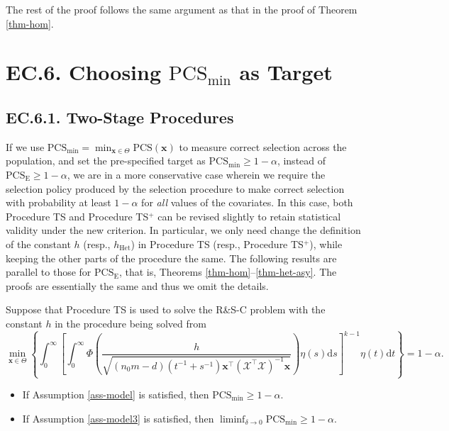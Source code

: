 \documentclass[ijoc,nonblindrev]{informs3}
\def\ud{\mathrm{d}}
\def\bx{{\bm x}}
\def\cX{{\mathcal X}}
\def\PCS{\mathrm{PCS}}
\def\PCSE{\mathrm{PCS}_{\mathrm{E}}}
\def\hhet{h_{\mathrm{Het}}}
\def\PCSmin{\mathrm{PCS}_{\mathrm{min}}}
\begin{document}
The rest of the proof follows the same argument as that in the proof of Theorem \ref{thm-hom}.
\Halmos
\endproof


\hypertarget{EC.6}{
\section*{EC.6. \hspace{5pt} Choosing $\PCSmin$ as Target}
}

\vspace{10pt}
\subsection*{EC.6.1. \hspace{5pt} Two-Stage Procedures}
If we use $\PCSmin = \min_{\bx\in\Theta} \PCS(\bx)$ to measure correct selection across the population, and set the pre-specified target as $\PCSmin \geq 1-\alpha$, instead of $\PCSE \geq 1-\alpha$, we are in a more conservative case
wherein we require  the selection policy produced by the selection procedure to make correct selection with probability at least $1-\alpha$ for \emph{all} values of the covariates.
In this case, both Procedure TS and Procedure TS$^+$ can be revised slightly to retain statistical validity under the new criterion.
In particular, we only need change the definition of the constant $h$ (resp., $\hhet$) in Procedure TS (resp., Procedure TS$^+$), while keeping the other parts of the procedure the same.
The following results are parallel to those for $\PCSE$, that is, Theorems \ref{thm-hom}--\ref{thm-het-asy}.
The proofs are essentially the same and thus we omit the details.


\begin{theorem}
Suppose that Procedure TS is used to solve the R\&S-C problem with the constant $h$ in the procedure being solved from
\begin{equation} \label{eq-geth-min}
\min_{\bx\in\Theta} \left\{ \int_0^\infty \left[\int_0^\infty \Phi \left( \frac{h}{\sqrt{(n_0m-d) (t^{-1}+s^{-1})\bx^\intercal (\cX^\intercal \cX)^{-1} \bx}} \right) \eta(s)\ud s \right]^{k-1} \eta(t) \ud t \right\} = 1-\alpha.
\end{equation}
\begin{itemize}
    \item If Assumption \ref{ass-model} is satisfied, then $\PCSmin \geq 1-\alpha$.
    \item If Assumption \ref{ass-model3} is satisfied, then $\liminf_{\delta \to  0} \PCSmin \geq 1-\alpha$.
\end{itemize}
\end{theorem}
\end{document}
